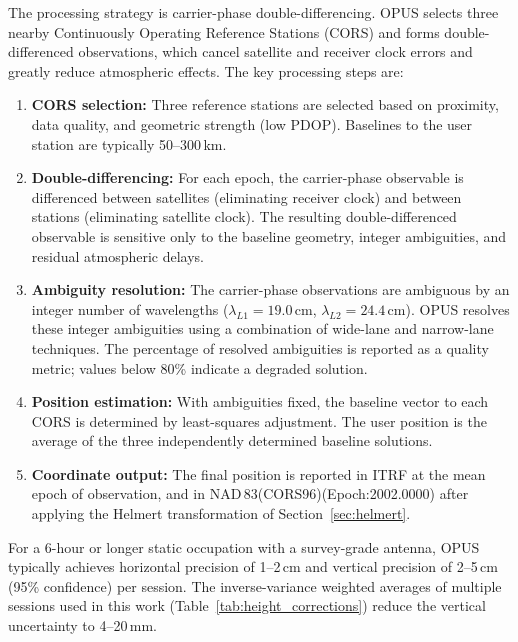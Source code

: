 The processing strategy is carrier-phase double-differencing. OPUS selects three nearby Continuously Operating Reference Stations (CORS) and forms double-differenced observations, which cancel satellite and receiver clock errors and greatly reduce atmospheric effects. The key processing steps are:
\begin{enumerate}[nosep]
\item \textbf{CORS selection:} Three reference stations are selected based on proximity, data quality, and geometric strength (low PDOP). Baselines to the user station are typically 50--300\,km.
\item \textbf{Double-differencing:} For each epoch, the carrier-phase observable is differenced between satellites (eliminating receiver clock) and between stations (eliminating satellite clock). The resulting double-differenced observable is sensitive only to the baseline geometry, integer ambiguities, and residual atmospheric delays.
\item \textbf{Ambiguity resolution:} The carrier-phase observations are ambiguous by an integer number of wavelengths ($\lambda_{L1} = 19.0$\,cm, $\lambda_{L2} = 24.4$\,cm). OPUS resolves these integer ambiguities using a combination of wide-lane and narrow-lane techniques. The percentage of resolved ambiguities is reported as a quality metric; values below 80\% indicate a degraded solution.
\item \textbf{Position estimation:} With ambiguities fixed, the baseline vector to each CORS is determined by least-squares adjustment. The user position is the average of the three independently determined baseline solutions.
\item \textbf{Coordinate output:} The final position is reported in ITRF at the mean epoch of observation, and in NAD\,83(CORS96)(Epoch:2002.0000) after applying the Helmert transformation of Section~\ref{sec:helmert}.
\end{enumerate}
For a 6-hour or longer static occupation with a survey-grade antenna, OPUS typically achieves horizontal precision of 1--2\,cm and vertical precision of 2--5\,cm (95\% confidence) per session. The inverse-variance weighted averages of multiple sessions used in this work (Table~\ref{tab:height_corrections}) reduce the vertical uncertainty to 4--20\,mm.




